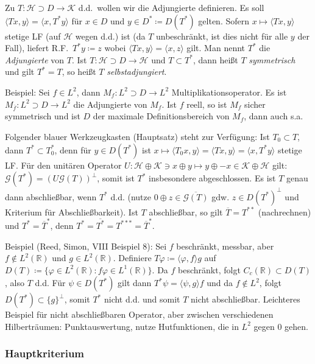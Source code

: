\documentclass[11pt,a4paper]{scrartcl}
\newcommand{\R}{\mathbb{R}} %
\newcommand{\Hc}{\mathcal{H}}
\newcommand{\Kc}{\mathcal{K}}
\newcommand{\G}{\mathcal{G}}
\theoremstyle{plain}
\theoremstyle{definition}
\theoremstyle{remark}
\begin{document}
Zu $T:\Hc \supset D \to \Kc$ d.d.\ wollen wir die Adjungierte definieren. Es soll $\langle Tx,y \rangle = \langle x, T^*y \rangle$ für $x\in D$ und $y\in D^*\coloneqq D(T^*)$ gelten. Sofern $x\mapsto \langle Tx, y \rangle$ stetige LF (auf $\Hc$ wegen d.d.) ist (da $T$ unbeschränkt, ist dies nicht für alle $y$ der Fall), liefert R.F.\ $T^*y\coloneqq z$ wobei $\langle Tx,y \rangle = \langle x, z \rangle$ gilt. Man nennt $T^*$ die \emph{Adjungierte} von $T$. Ist $T: \Hc \supset D \to \Hc$ und $T \subset T^*$, dann heißt $T$ \emph{symmetrisch} und gilt $T^*=T$, so heißt $T$ \emph{selbstadjungiert}. 

Beispiel: Sei $f\in L^2$, dann $M_f: L^2\supset D \to L^2$ Multiplikationsoperator. Es ist $M_{\overline{f}}: L^2 \supset D \to L^2$ die Adjungierte von $M_f$. Ist $f$ reell, so ist $M_f$ sicher symmetrisch und ist $D$ der maximale Definitionsbereich von $M_f$, dann auch s.a.

Folgender blauer Werkzeugkasten (Hauptsatz) steht zur Verfügung: Ist $T_0 \subset T$, dann $T^* \subset T_0^*$, denn für $y\in D(T^*)$ ist $x\mapsto \langle T_0 x, y \rangle = \langle Tx, y\rangle = \langle x, T^* y \rangle$ stetige LF. Für den unitären Operator $U: \Hc \oplus \Kc \ni x \oplus y \mapsto y \oplus -x \in \Kc \oplus \Hc$ gilt: $\G(T^*) = (U\G(T))^\perp$, somit ist $T^*$ insbesondere abgeschlossen. Es ist $T$ genau dann abschließbar, wenn $T^*$ d.d. (nutze $0\oplus z \in \overline{\G(T)}$ gdw. $z\in D(T^*)^\perp$ und Kriterium für Abschließbarkeit). Ist $T$ abschließbar, so gilt $\overline{T} = T^{**}$ (nachrechnen) und $T^* = \overline{T}^*$, denn $T^*=\overline{T^*}=T^{***}=\overline{T}^*$.

Beispiel (Reed, Simon, VIII Beispiel 8): Sei $f$ beschränkt, messbar, aber $f\not\in L^2(\R)$ und $g\in L^2(\R)$. Definiere $T\varphi \coloneqq \langle \varphi, f \rangle g$ auf $D(T)\coloneqq \{ \varphi\in L^2(\R): f\varphi \in L^1(\R) \}$. Da $f$ beschränkt, folgt $C_c(\R) \subset D(T)$, also $T$ d.d. Für $\psi \in D(T^*)$ gilt dann $T^*\psi = \langle \psi, g \rangle f$ und da $f\not \in L^2$, folgt $D(T^*) \subset \{ g \}^\perp$, somit $T^*$ nicht d.d. und somit $T$ nicht abschließbar. Leichteres Beispiel für nicht abschließbaren Operator, aber zwischen verschiedenen Hilberträumen: Punktauswertung, nutze Hutfunktionen, die in $L^2$ gegen $0$ gehen.

\subsubsection{Hauptkriterium}
\end{document}
